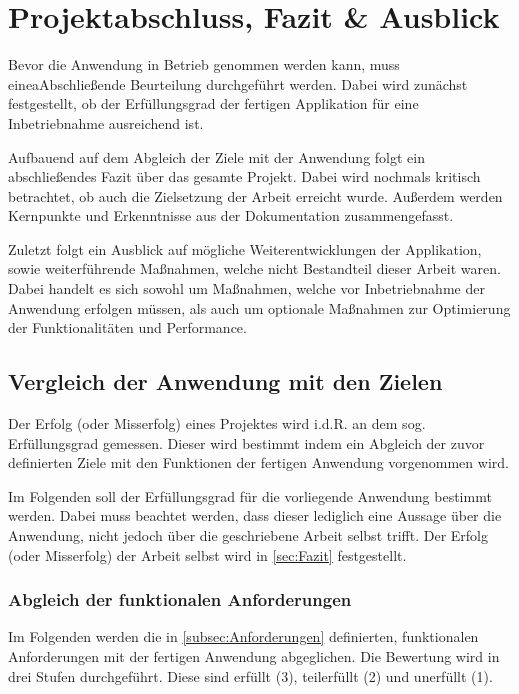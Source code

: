 
\chapter{Projektabschluss, Fazit \& Ausblick}\label{cha:Schlussbetrachtung}
Bevor die Anwendung in Betrieb genommen werden kann, muss eineaAbschließende Beurteilung durchgeführt werden. Dabei wird zunächst festgestellt, ob der Erfüllungsgrad der fertigen Applikation für eine Inbetriebnahme ausreichend ist.

Aufbauend auf dem Abgleich der Ziele mit der Anwendung folgt ein abschließendes Fazit über das gesamte Projekt. Dabei wird nochmals kritisch betrachtet, ob auch die Zielsetzung der Arbeit erreicht wurde. Außerdem werden Kernpunkte und Erkenntnisse aus der Dokumentation zusammengefasst.

Zuletzt folgt ein Ausblick auf mögliche Weiterentwicklungen der Applikation, sowie weiterführende Maßnahmen, welche nicht Bestandteil dieser Arbeit waren. Dabei handelt es sich sowohl um Maßnahmen, welche vor Inbetriebnahme der Anwendung erfolgen müssen, als auch um optionale Maßnahmen zur Optimierung der Funktionalitäten und Performance. 


\section{Vergleich der Anwendung mit den Zielen}
Der Erfolg (oder Misserfolg) eines Projektes wird i.d.R. an dem sog. Erfüllungsgrad gemessen. Dieser wird bestimmt indem ein Abgleich der zuvor definierten Ziele mit den Funktionen der fertigen Anwendung vorgenommen wird.

Im Folgenden soll der Erfüllungsgrad für die vorliegende Anwendung bestimmt werden. Dabei muss beachtet werden, dass dieser lediglich eine Aussage über die Anwendung, nicht jedoch über die geschriebene Arbeit selbst trifft. Der Erfolg (oder Misserfolg) der Arbeit selbst wird in \autoref{sec:Fazit} festgestellt.

\subsection{Abgleich der funktionalen Anforderungen}
Im Folgenden werden die in \autoref{subsec:Anforderungen} definierten, funktionalen Anforderungen mit der fertigen Anwendung abgeglichen. Die Bewertung wird in drei Stufen durchgeführt. Diese sind erfüllt (3), teilerfüllt (2) und unerfüllt (1).

